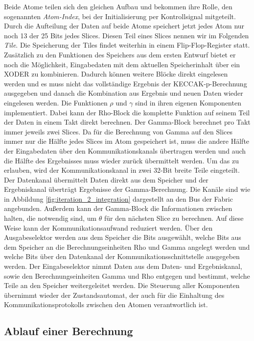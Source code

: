 Beide Atome teilen sich den gleichen Aufbau und bekommen ihre Rolle, den sogenannten \textit{Atom-Index}, bei der Initialisierung per Kontrollsignal mitgeteilt.
Durch die Aufteilung der Daten auf beide Atome speichert jetzt jedes Atom nur noch 13 der 25 Bits jedes Slices. Diesen Teil eines Slices nennen wir im Folgenden \textit{Tile}.
Die Speicherung der Tiles findet weiterhin in einem Flip-Flop-Register statt. Zusätzlich zu den Funktionen des Speichers aus dem ersten Entwurf bietet er noch die Möglichkeit,
Eingabedaten mit dem aktuellen Speicherinhalt über ein XODER zu kombinieren. Dadurch können weitere Blöcke direkt eingelesen werden und es muss nicht das vollständige Ergebnis
der KECCAK-p-Berechnung ausgegeben und danach die Kombination aus Ergebnis und neuen Daten wieder eingelesen werden.
Die Funktionen $\rho$ und $\gamma$ sind in ihren eigenen Komponenten implementiert.
Dabei kann der Rho-Block die komplette Funktion auf seinem Teil der Daten in einem Takt direkt berechnen. Der Gamma-Block berechnet pro Takt immer jeweils zwei Slices.
Da für die Berechnung von Gamma auf den Slices immer nur die Hälfte jedes Slices im Atom gespeichert ist, muss die andere Hälfte der Eingabedaten über den Kommunikationskanals
übertragen werden und auch die Hälfte des Ergebnisses muss wieder zurück übermittelt werden. Um das zu erlauben, wird der Kommunikationskanal in zwei 32-Bit breite Teile eingeteilt.
Der Datenkanal übermittelt Daten direkt aus dem Speicher und der Ergebniskanal überträgt Ergebnisse der Gamma-Berechnung. Die Kanäle sind wie in Abbildung
\ref{fig:iteration_2_integration} dargestellt an den Bus der Fabric angebunden. Außerdem kann der Gamma-Block die Informationen zwischen halten, die notwendig sind,
um $\theta$ für den nächsten Slice zu berechnen. Auf diese Weise kann der Kommunikationsaufwand reduziert werden.
Über den Ausgabeselektor werden aus dem Speicher die Bits ausgewählt, welche Bits aus dem Speicher an die Berechnungseinheiten Rho und Gamma angelegt werden
und welche Bits über den Datenkanal der Kommunikationsschnittstelle ausgegeben werden. Der Eingabeselektor nimmt Daten aus dem Daten- und Ergebniskanal,
sowie den Berechnungseinheiten Gamma und Rho entgegen und bestimmt, welche Teile an den Speicher weitergeleitet werden.
Die Steuerung aller Komponenten übernimmt wieder der Zustandsautomat, der auch für die Einhaltung des Kommunikationsprotokolls zwischen den Atomen verantwortlich ist.

\subsection{Ablauf einer Berechnung}

